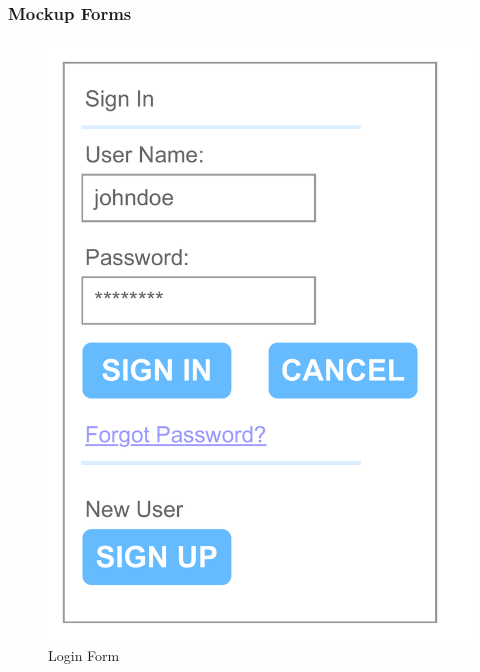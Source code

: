 \documentclass{article}
\begin{document}
        \subsubsection{Mockup Forms}
        \begin{multicols}{3}
                \begin{figure}[H]
                        \centering
                        \includegraphics[width = 0.9\columnwidth]{images/design/Login_Form.pdf}
                        \caption{Login Form}
                        \label{fig:ie_3}
                \end{figure}
                \begin{figure}[H]
                        \centering

\end{figure}
\end{multicols}
\end{document}
